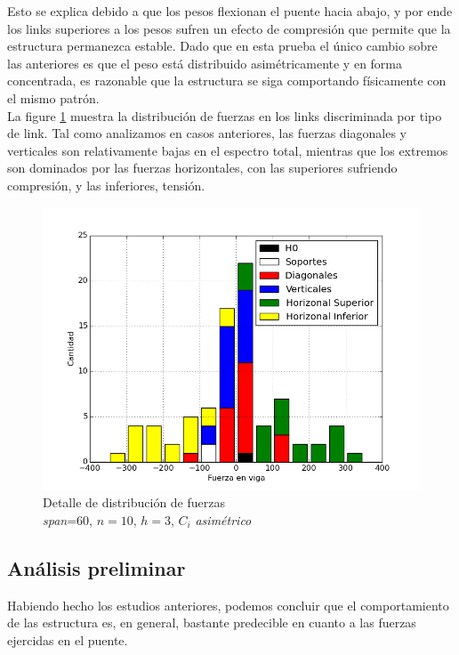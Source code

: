 Esto se explica debido a que los pesos flexionan el puente hacia abajo, y por ende los links superiores a los pesos sufren un efecto de compresión que permite que la estructura permanezca estable. Dado que en esta prueba el único cambio sobre las anteriores es que el peso está distribuido asimétricamente y en forma concentrada, es razonable que la estructura se siga comportando físicamente con el mismo patrón.\\

La figure \ref{fig:hist_asim} muestra la distribución de fuerzas en los links discriminada por tipo de link. Tal como analizamos en casos anteriores, las fuerzas diagonales y verticales son relativamente bajas en el espectro total, mientras que los extremos son dominados por las fuerzas horizontales, con las superiores sufriendo compresión, y las inferiores, tensión. 

\begin{figure}[h!]
\begin{center}
\includegraphics[scale=0.5]{archivos/graficos/hist_asim.png}
\caption{\label{fig:hist_asim}Detalle de distribución de fuerzas\\
\textit{span}=$60$, $n=10$, $h=3$, $C_i$ \textit{asimétrico}}
\end{center}
\end{figure}

\subsection{Análisis preliminar}

Habiendo hecho los estudios anteriores, podemos concluir que el comportamiento de las estructura es, en general, bastante predecible en cuanto a las fuerzas ejercidas en el puente.\\

